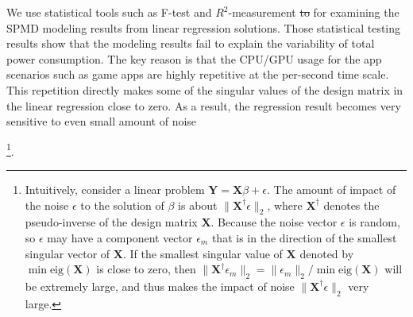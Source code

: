 \begin{itemize}
{\color{blue}\item We use statistical tools such as F-test and $R^2$-measurement \st{to} for examining the SPMD modeling results from linear regression solutions. Those statistical testing results show that the modeling results fail to explain the variability of total power consumption. The key reason is that the CPU/GPU usage for the app scenarios such 
as game apps are highly repetitive at the per-second time scale. This repetition directly makes some of the singular values of the design matrix in the linear regression close to zero. As a result, the regression result becomes very sensitive to even small amount of noise}\footnote{{\color{blue}Intuitively, consider a linear problem $\mathbf{Y}=\mathbf{X}\beta+\epsilon$. The amount of impact of the noise $\epsilon$ to the solution of $\beta$ is about $\|\mathbf{X}^{\dagger}\epsilon\|_2$, where $\mathbf{X}^{\dagger}$ denotes the pseudo-inverse of the design matrix $\mathbf{X}$. Because the noise vector $\epsilon$ is random, so $\epsilon$ may have a component vector $\epsilon_m$ that is in the direction of the smallest singular vector of $\mathbf{X}$. If the smallest singular value of $\mathbf{X}$ denoted by $\min\text{eig}(\mathbf{X})$ is close to zero, then $\|\mathbf{X}^{\dagger}\epsilon_m\|_2=\|\epsilon_m\|_2/\min\text{eig}(\mathbf{X})$ will be extremely large, and thus makes the impact of noise $\|\mathbf{X}^{\dagger}\epsilon\|_2$ very large.}}.


\end{itemize}
